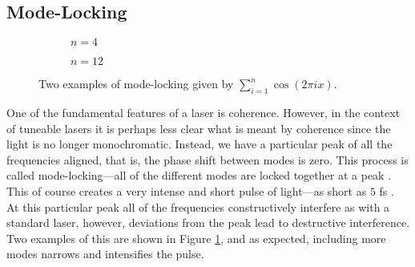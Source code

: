 \subsection{Mode-Locking}
\begin{figure}[tbp]
\centering
\begin{subfigure}{0.5\textwidth}

\caption{$n = 4$}
\end{subfigure}%
\begin{subfigure}{0.5\textwidth}

\caption{$n = 12$}
\end{subfigure}
\caption[Two examples of mode-locking.]{Two examples of mode-locking given by $\displaystyle \sum_{i = 1}^n \cos \left( 2 \pi i x \right)$.}
\label{fig:ml}
\end{figure}
One of the fundamental features of a laser is coherence. However, in the context of tuneable lasers it is perhaps less clear what is meant by coherence since the light is no longer monochromatic. Instead, we have a particular peak of all the frequencies aligned, that is, the phase shift between modes is zero. This process is called mode-locking---all of the different modes are locked together at a peak \cite{agrawal2013, hausbook, silfvast}. This of course creates a very intense and short pulse of light---as short as $5$ fs \cite{silfvast}. At this particular peak all of the frequencies constructively interfere as with a standard laser, however, deviations from the peak lead to destructive interference. Two examples of this are shown in Figure \ref{fig:ml}, and as expected, including more modes narrows and intensifies the pulse. \\


